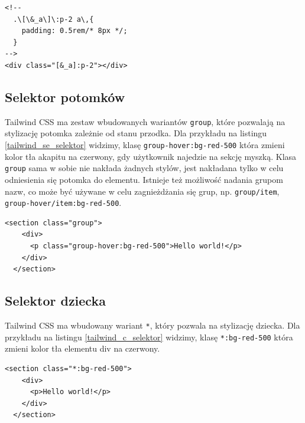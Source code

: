 \documentclass[a4paper,12pt]{book} %
\begin{document}
\begin{lstfloat}[hb]
  \lstset{language=HTML}
  \begin{lstlisting}[frame=single]
<!--
  .\[\&_a\]\:p-2 a\,{
    padding: 0.5rem/* 8px */;
  }
-->
<div class="[&_a]:p-2"></div>
\end{lstlisting}
  \caption{Klasa zmieniająca padding dla przodków będących elementem \lstinline|a|}\label{tailwind_child_element_selector}
\end{lstfloat}
\subsection{Selektor potomków}
Tailwind CSS ma zestaw wbudowanych wariantów \lstinline|group|, które pozwalają na stylizację potomka zależnie od stanu przodka. Dla przykładu na listingu \ref{tailwind_se_selektor} widzimy, klasę \lstinline|group-hover:bg-red-500| która zmieni kolor tła akapitu na czerwony, gdy użytkownik najedzie na sekcję myszką. Klasa \lstinline|group| sama w sobie nie nakłada żadnych stylów, jest nakładana tylko w celu odniesienia się potomka do elementu. Istnieje też możliwość nadania grupom nazw, co może być używane w celu zagnieżdżania się grup, np. \lstinline|group/item|, \lstinline|group-hover/item:bg-red-500|.

\begin{lstfloat}[hb]
  \lstset{language=HTML}
  \begin{lstlisting}[frame=single]
  <section class="group">
    <div>
      <p class="group-hover:bg-red-500">Hello world!</p>
    </div>
  </section>
\end{lstlisting}
  \caption{Przykład wykorzystania klasy \lstinline|group|}\label{tailwind_se_selektor}
\end{lstfloat}

\subsection{Selektor dziecka}
Tailwind CSS ma wbudowany wariant \lstinline|*|, który pozwala na stylizację dziecka. Dla przykładu na listingu \ref{tailwind_c_selektor} widzimy, klasę \lstinline|*:bg-red-500| która zmieni kolor tła elementu div na czerwony.

\begin{lstfloat}[hb]
  \lstset{language=HTML}
  \begin{lstlisting}[frame=single]
  <section class="*:bg-red-500">
    <div>
      <p>Hello world!</p>
    </div>
  </section>
\end{lstlisting}
  \caption{Przykład wykorzystania selektora dziecka}\label{tailwind_c_selektor}
\end{lstfloat}
\clearpage
\end{document}
